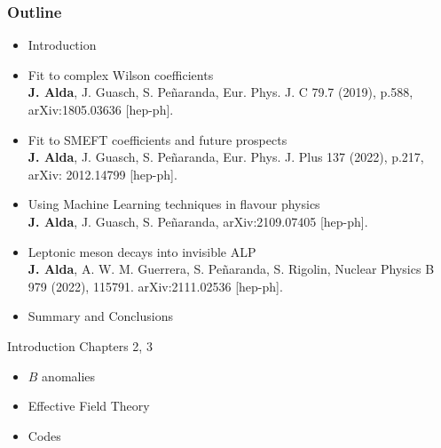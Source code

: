 \documentclass[mathserif, 10pt, dvipsnames]{beamer}
\begin{document}
\begin{frame}\frametitle{Outline}
    \begin{itemize}
        \item Introduction
\item Fit to complex Wilson coefficients \\{\color{red}\scriptsize \textbf{J. Alda}, J. Guasch, S. Peñaranda, Eur. Phys. J. C 79.7 (2019), p.588, arXiv:1805.03636 [hep-ph].}
\item Fit to SMEFT coefficients and future prospects \\
{\color{red}\scriptsize \textbf{J. Alda}, J. Guasch, S. Peñaranda,
Eur. Phys. J. Plus 137 (2022), p.217, arXiv: 2012.14799 [hep-ph].}
\item Using Machine Learning techniques in flavour physics \\
{\color{red}\scriptsize \textbf{J. Alda}, J. Guasch, S. Peñaranda, arXiv:2109.07405 [hep-ph].}
\item Leptonic meson decays into invisible ALP \\
{\color{red}\scriptsize \textbf{J. Alda}, A. W. M. Guerrera, S. Peñaranda, S. Rigolin,
Nuclear Physics B 979 (2022), 115791. arXiv:2111.02536 [hep-ph].}
\item Summary and Conclusions
    \end{itemize}
\end{frame}

\begin{frame}[plain] %
\begin{block}{\huge Introduction}
Chapters 2, 3
\end{block}
\vspace{1cm}
\begin{itemize}
    \item $B$ anomalies
    \item Effective Field Theory
    \item Codes
\end{itemize}
\end{frame}
\end{document}
